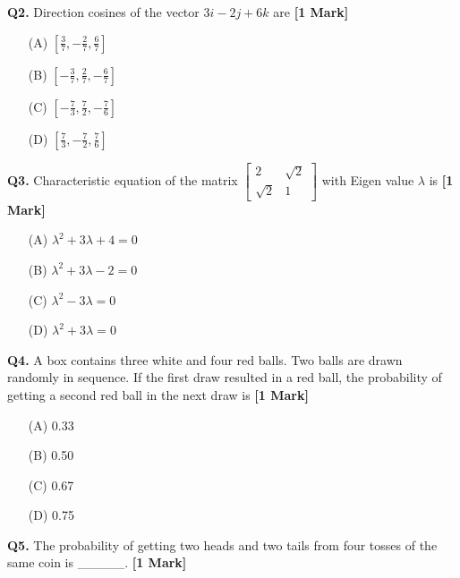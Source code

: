 \documentclass[11pt]{article}
\newcommand{\questiona}[2]{
    \noindent\textbf{Q#2.} #1 \hfill \textbf{[1 Mark]}
}
\begin{document}
\vspace{0.5cm}

\questiona{Direction cosines of the vector $3i - 2j + 6k$ are}{2}
\begin{enumerate}
    \item[(A)] $\left[\frac{3}{7}, -\frac{2}{7}, \frac{6}{7}\right]$
    \item[(B)] $\left[-\frac{3}{7}, \frac{2}{7}, -\frac{6}{7}\right]$  
    \item[(C)] $\left[-\frac{7}{3}, \frac{7}{2}, -\frac{7}{6}\right]$
    \item[(D)] $\left[\frac{7}{3}, -\frac{7}{2}, \frac{7}{6}\right]$
\end{enumerate}

\vspace{0.5cm}

\questiona{Characteristic equation of the matrix  
$\begin{bmatrix}
2 & \sqrt{2} \\
\sqrt{2} & 1
\end{bmatrix}$
with Eigen value $\lambda$ is}{3}
\begin{enumerate}
    \item[(A)] $\lambda^2 + 3\lambda + 4 = 0$
    \item[(B)] $\lambda^2 + 3\lambda - 2 = 0$  
    \item[(C)] $\lambda^2 - 3\lambda = 0$
    \item[(D)] $\lambda^2 + 3\lambda = 0$
\end{enumerate}

\vspace{0.5cm}

\questiona{A box contains three white and four red balls. Two balls are drawn randomly in sequence. If the first draw resulted in a red ball, the probability of getting a second red ball in the next draw is}{4}
\begin{enumerate}
    \item[(A)] 0.33
    \item[(B)] 0.50  
    \item[(C)] 0.67
    \item[(D)] 0.75
\end{enumerate}

\vspace{0.5cm}

\questiona{The probability of getting two heads and two tails from four tosses of the same coin is \_\_\_\_\_.}{5}
\vspace{0.5cm}
\end{document}
